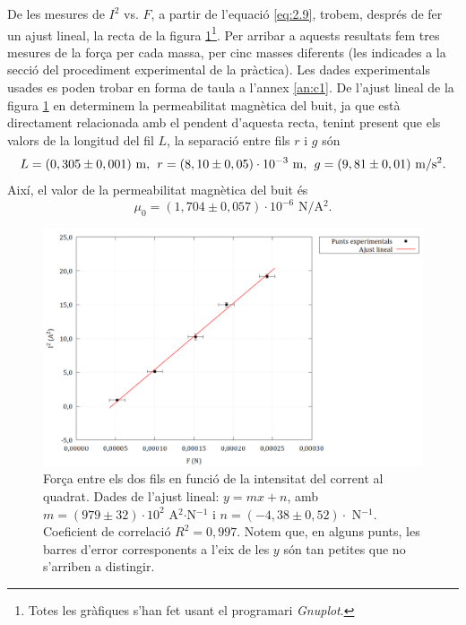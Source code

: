 \documentclass[a4paper,10.5pt]{report}
\begin{document}
De les mesures de $I^2$ vs. $F$, a partir de l'equació \eqref{eq:2.9}, trobem, després de fer un ajust lineal, la recta de la figura \ref{fig:2.3}\footnote{Totes les gràfiques s'han fet usant el programari \textit{Gnuplot}.}. Per arribar a aquests resultats fem tres mesures de la força per cada massa, per cinc masses diferents (les indicades a la secció del procediment experimental de la pràctica). Les dades experimentals usades es poden trobar en forma de taula a l'annex \ref{an:c1}. De l'ajust lineal de la figura \ref{fig:2.3} en determinem la permeabilitat magnètica del buit, ja que està directament relacionada amb el pendent d'aquesta recta, tenint present que els valors de la longitud del fil $L$, la separació entre fils $r$ i $g$ són
\begin{equation*}
	L = (0,305\pm 0,001)\text{ m}, \hspace{0.15cm} r = (8,10\pm 0,05)\cdot10^{-3} \text{ m}, \hspace{0.15cm} g = (9,81\pm 0,01) \text{ m/s$^2$}.
\end{equation*}
Així, el valor de la permeabilitat magnètica del buit és
\begin{equation*}
	\mu_0 = (1,704\pm0,057)\cdot 10^{-6} \text{ N/A$^2$}.
\end{equation*}

\begin{figure}
	\centering
\includegraphics[width=0.8\linewidth]{screenshot020}
\caption{Força entre els dos fils en funció de la intensitat del corrent al quadrat. Dades de l'ajust lineal: $y=mx+n$, amb $m = (979 \pm 32)\cdot 10^{2}$ A$^2$$\cdot$N$^{-1}$ i $n = (-4,38\pm0,52)\cdot$ N$^{-1}$. Coeficient de correlació $R^2=0,997$. Notem que, en alguns punts, les barres d'error corresponents a l'eix de les $y$ són tan petites que no s'arriben a distingir.}
\label{fig:2.3}
\end{figure}
\end{document}

